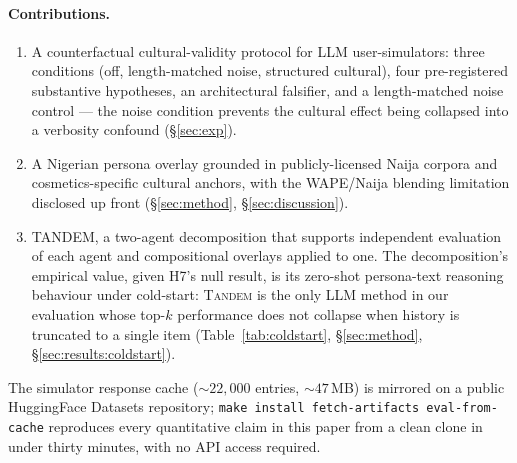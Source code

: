 \documentclass[8pt,twocolumn,a4paper]{extarticle}
\begin{document}
\paragraph{Contributions.}
\begin{enumerate}
\itemsep0.05em
    \item A counterfactual cultural-validity protocol for LLM user-simulators: three conditions (off, length-matched noise, structured cultural), four pre-registered substantive hypotheses, an architectural falsifier, and a length-matched noise control --- the noise condition prevents the cultural effect being collapsed into a verbosity confound (\S\ref{sec:exp}).
    \item A Nigerian persona overlay grounded in publicly-licensed Naija corpora and cosmetics-specific cultural anchors, with the WAPE/Naija blending limitation disclosed up front (\S\ref{sec:method}, \S\ref{sec:discussion}).
    \item TANDEM, a two-agent decomposition that supports independent evaluation of each agent and compositional overlays applied to one. The decomposition's empirical value, given H7's null result, is its zero-shot persona-text reasoning behaviour under cold-start: \textsc{Tandem} is the only LLM method in our evaluation whose top-$k$ performance does not collapse when history is truncated to a single item (Table~\ref{tab:coldstart}, \S\ref{sec:method}, \S\ref{sec:results:coldstart}).
\end{enumerate}

The simulator response cache (${\sim}22{,}000$ entries, ${\sim}47$\,MB) is mirrored on a public HuggingFace Datasets repository; \texttt{make install fetch-artifacts eval-from-cache} reproduces every quantitative claim in this paper from a clean clone in under thirty minutes, with no API access required.
\end{document}
